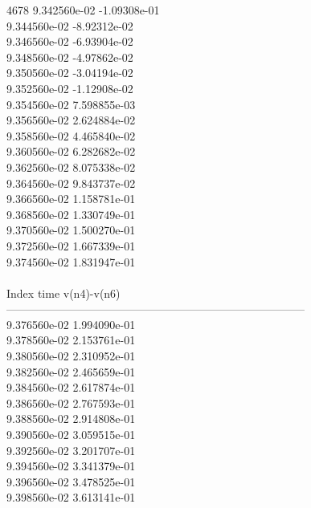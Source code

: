 4678	9.342560e-02	-1.09308e-01	\\ 	9.344560e-02	-8.92312e-02	\\ 	9.346560e-02	-6.93904e-02	\\ 	9.348560e-02	-4.97862e-02	\\ 	9.350560e-02	-3.04194e-02	\\ 	9.352560e-02	-1.12908e-02	\\ 	9.354560e-02	7.598855e-03	\\ 	9.356560e-02	2.624884e-02	\\ 	9.358560e-02	4.465840e-02	\\ 	9.360560e-02	6.282682e-02	\\ 	9.362560e-02	8.075338e-02	\\ 	9.364560e-02	9.843737e-02	\\ 	9.366560e-02	1.158781e-01	\\ 	9.368560e-02	1.330749e-01	\\ 	9.370560e-02	1.500270e-01	\\ 	9.372560e-02	1.667339e-01	\\ 	9.374560e-02	1.831947e-01	\\ \hline
\\ \hline
Index   time            v(n4)-v(n6)     \\ \hline
--------------------------------------------------------------------------------\\ 	9.376560e-02	1.994090e-01	\\ 	9.378560e-02	2.153761e-01	\\ 	9.380560e-02	2.310952e-01	\\ 	9.382560e-02	2.465659e-01	\\ 	9.384560e-02	2.617874e-01	\\ 	9.386560e-02	2.767593e-01	\\ 	9.388560e-02	2.914808e-01	\\ 	9.390560e-02	3.059515e-01	\\ 	9.392560e-02	3.201707e-01	\\ 	9.394560e-02	3.341379e-01	\\ 	9.396560e-02	3.478525e-01	\\ 	9.398560e-02	3.613141e-01	\\ \hline
